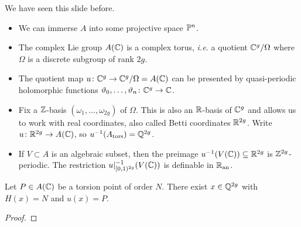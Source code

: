 \documentclass{beamer}
\begin{document}
\begin{frame}{We have seen this slide before.}
  \begin{itemize}
  \item We can immerse $A$ into some projective space ${\mathbb{P}}^n$.

  \item The complex Lie group $A({\mathbb{C}})$ is a complex torus, \textit{i.e.} a
    quotient ${\mathbb{C}}^g/\Omega$ where $\Omega$ is a discrete subgroup of
    rank $2g$.

  \item The quotient map $u\colon {\mathbb{C}}^g\rightarrow {\mathbb{C}}^g/\Omega
    =A({\mathbb{C}})$ can be presented by quasi-periodic holomorphic functions
    $\vartheta_0,\ldots,\vartheta_n \colon {\mathbb{C}}^g\rightarrow{\mathbb{C}}$.

  \item Fix a ${\mathbb{Z}}$-basis $(\omega_1,\ldots,\omega_{2g})$ of $\Omega$.
    This is also an ${\mathbb{R}}$-basis of ${\mathbb{C}}^g$ and allows us to work with
    \alert{real coordinates}, also called \alert{Betti coordinates} ${\mathbb{R}}^{2g}$.
    Write $ u\colon {\mathbb{R}}^{2g}\rightarrow A({\mathbb{C}})$, so
    $ u^{-1}(A_{\mathrm{tors}})={\mathbb{Q}}^{2g}$. 

  \item If $V\subset A$ is an algebraic subset, then the preimage
    $ u^{-1}(V({\mathbb{C}})) \subseteq{\mathbb{R}}^{2g}$ is ${\mathbb{Z}}^{2g}$-periodic.
    The restriction $u|_{[0,1)^{2g}}^{-1}(V({\mathbb{C}}))$ is definable in ${{\mathbb{R}}_{\mathrm{an}}}$.
  \end{itemize}
\end{frame}

\begin{frame}

  \begin{lemma}
    Let $P\in A({\mathbb{C}})$ be a torsion point of order $N$.
    There exist $x\in {\mathbb{Q}}^{2g}$ with $H(x)=N$ and $u(x)=P$. 
  \end{lemma}
  \begin{proof}
    \vspace{2cm}
  \end{proof}
\end{frame}
\end{document}
